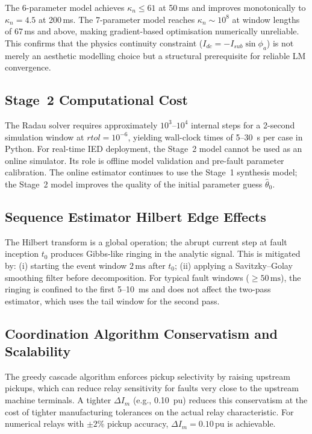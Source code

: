 \documentclass[12pt,a4paper]{article}
\theoremstyle{definition}
\theoremstyle{plain}
\newcommand{\pu}{\,\text{pu}}
\newcommand{\mss}{\,\text{ms}}
\begin{document}
The 6-parameter model achieves $\kappa_n \leq 61$ at 50\,ms and improves
monotonically to $\kappa_n = 4.5$ at 200\,ms.  The 7-parameter model
reaches $\kappa_n \sim 10^8$ at window lengths of 67\,ms and above,
making gradient-based optimisation numerically unreliable.  This confirms
that the physics continuity constraint ($I_{dc} = -I_{sub}\sin\phi_a$)
is not merely an aesthetic modelling choice but a structural prerequisite
for reliable LM convergence.

\subsection{Stage~2 Computational Cost}
\label{sec:disc:parkdq}

The Radau solver requires approximately $10^3$--$10^4$ internal steps for a
2-second simulation window at $rtol = 10^{-6}$, yielding wall-clock times of
5--30~s per case in Python.  For real-time IED deployment, the Stage~2 model
cannot be used as an online simulator.  Its role is offline model validation
and pre-fault parameter calibration.  The online estimator continues to use
the Stage~1 synthesis model; the Stage~2 model improves the quality of the
initial parameter guess $\hat{\theta}_0$.

\subsection{Sequence Estimator Hilbert Edge Effects}
\label{sec:disc:hilbert}

The Hilbert transform is a global operation; the abrupt current step at fault
inception $t_0$ produces Gibbs-like ringing in the analytic signal.  This is
mitigated by: (i) starting the event window $2\mss$ after $t_0$; (ii) applying
a Savitzky--Golay smoothing filter before decomposition.  For typical fault
windows ($\geq 50\mss$), the ringing is confined to the first 5--10~ms and
does not affect the two-pass estimator, which uses the tail window for the
second pass.

\subsection{Coordination Algorithm Conservatism and Scalability}
\label{sec:disc:coord}

The greedy cascade algorithm enforces pickup selectivity by raising upstream
pickups, which can reduce relay sensitivity for faults very close to the
upstream machine terminals.  A tighter $\Delta I_m$ (e.g., 0.10~pu) reduces
this conservatism at the cost of tighter manufacturing tolerances on the
actual relay characteristic.  For numerical relays with $\pm 2\%$ pickup
accuracy, $\Delta I_m = 0.10\pu$ is achievable.
\end{document}
